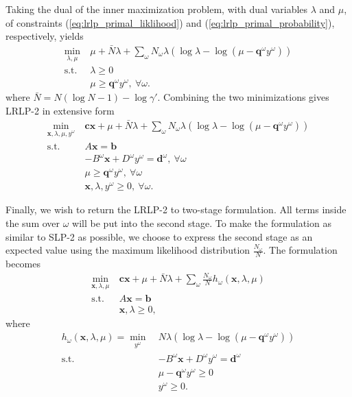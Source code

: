 \documentclass{iserc}
\newcommand{\x}{\mathbf{x}}
\renewcommand{\c}{\mathbf{c}}
\newcommand{\q}{\mathbf{q}}
\renewcommand{\b}{\mathbf{b}}
\renewcommand{\d}{\mathbf{d}}
\newcommand{\st}{\mbox{s.t.}}
\begin{document}
Taking the dual of the inner maximization problem, with dual variables $\lambda$ and $\mu$, of constraints (\ref{eq:lrlp_primal_liklihood}) and (\ref{eq:lrlp_primal_probability}), respectively, yields
\begin{align*}
	\min_{\lambda,\mu} \ & \mu + \bar{N}\lambda + \sum_\omega N_\omega\lambda(\log\lambda - \log(\mu-\q^\omega y^\omega)) \\
	\st \ & \lambda \geq 0 \\
	& \mu \geq \q^\omega y^\omega, \ \forall \omega.
\end{align*}
where $\bar{N} = N(\log N - 1) - \log\gamma'$.
Combining the two minimizations gives LRLP-2 in extensive form
\begin{align}
	\min_{\x,\lambda,\mu,y^\omega} \ & \c\x + \mu + \bar{N}\lambda + \sum_\omega N_\omega\lambda(\log\lambda - \log(\mu-\q^\omega y^\omega)) \nonumber \\
	\st \ & A\x = \b \nonumber \\
	& -B^\omega \x + D^\omega y^\omega = \d^\omega,\ \forall \omega \label{eq:lrlp_det_equiv} \\
	& \mu \geq \q^\omega y^\omega, \ \forall \omega \nonumber \\
	& \x,\lambda,y^\omega \geq 0, \ \forall \omega. \nonumber
\end{align}

Finally, we wish to return the LRLP-2 to two-stage formulation.
All terms inside the sum over $\omega$ will be put into the second stage.
To make the formulation as similar to SLP-2 as possible, we choose to express the second stage as an expected value using the maximum likelihood distribution $\frac{N_\omega}{N}$.
The formulation becomes
\begin{align}
	\min_{\x,\lambda,\mu} \ & \c\x + \mu + \bar{N}\lambda + \sum_\omega \frac{N_\omega}{N} h_\omega(\x,\lambda,\mu) \nonumber \\
	\st \ & A\x = \b \label{eq:lrlp_two_stage} \\
	& \x,\lambda \geq 0, \nonumber
\end{align}
where
\begin{align}
	h_\omega(\x,\lambda,\mu) = \min_{y^\omega} \ & N\lambda (\log\lambda - \log(\mu - \q^\omega y^\omega)) \label{eq:lrlp_second_stage} \\
	\st \ & -B^\omega \x + D^\omega y^\omega = \d^\omega \nonumber \\
	& \mu - \q^\omega y^\omega \geq 0 \label{eq:lrlp_feas_constraint} \\
	& y^\omega \geq 0. \nonumber
\end{align}
\end{document}
